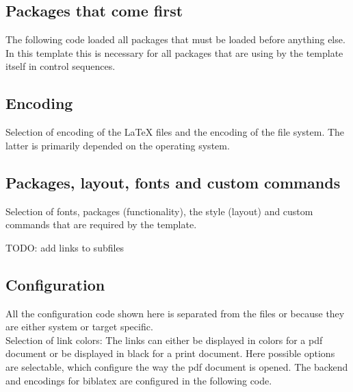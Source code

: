 \subsection{Packages that come first}
The following code loaded all packages that must be loaded before anything else. In this template this is necessary for all packages that are using by the template itself in control sequences.

\subsection{Encoding}
Selection of encoding of the LaTeX files and the encoding of the file system. The latter is primarily depended on the operating system.

\subsection{Packages, layout, fonts and custom commands}
Selection of fonts, packages (functionality), the style (layout) and custom commands that are required by the template.

TODO: add links to subfiles

\subsection{Configuration}
All the configuration code shown here is separated from the files  or  because they are either system or target specific.
\medskip\\\noindent
%
Selection of link colors: The links can either be displayed in colors for a pdf document or be displayed in black for a print document.
%
Here possible options are selectable, which configure the way the pdf document is opened.
%
The backend and encodings for biblatex are configured in the following code.

